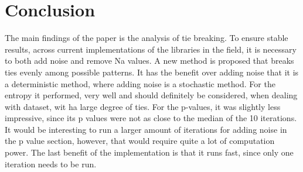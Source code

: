 \chapter{Conclusion}
The main findings of the paper is the analysis of tie breaking. To ensure stable results, across current implementations of the libraries in the field, it is necessary to both add noise and remove Na values. A new method is proposed that breaks ties evenly among possible patterns. It has the benefit over adding noise that it is a deterministic method, where adding noise is a stochastic method. For the entropy it performed, very well and should definitely be considered, when dealing with dataset, wit ha large degree of ties. For the p-values, it was slightly less impressive, since its p values were not as close to the median of the 10 iterations. It would be interesting to run a larger amount of iterations for adding noise in the p value section, however, that would require quite a lot of computation power. The last benefit of the implementation is that it runs fast, since only one iteration needs to be run. 